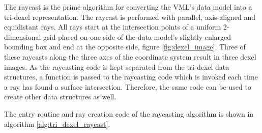 The raycast is the prime algorithm for converting the VML's data model into a tri-dexel representation.
The raycast is performed with parallel, axis-aligned and equidistant rays.
All rays start at the intersection points of a uniform 2-dimensional grid placed on one side of the data model's slightly enlarged bounding box and end at the opposite side, \cf figure \ref{fig:dexel_image}.
Three of these raycasts along the three axes of the coordinate system result in three dexel images.
As the raycasting code is kept separated from the tri-dexel data structures, a function is passed to the raycasting code which is invoked each time a ray has found a surface intersection.
Therefore, the same code can be used to create other data structures as well. %

The entry routine and ray creation code of the raycasting algorithm is shown in algorithm \ref{alg:tri_dexel_raycast}.
%
